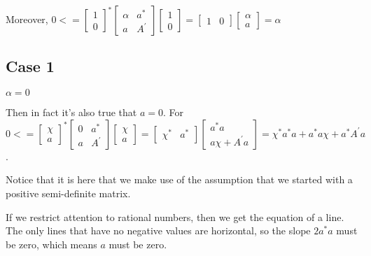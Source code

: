 \documentclass{article}
\begin{document}
Moreover, 
\begin{math}{}
0 <= \begin{bmatrix}1\\0\end{bmatrix}^*\begin{bmatrix}\alpha & a^* \\ a & A^{'}\end{bmatrix}\begin{bmatrix}1\\0\end{bmatrix}
= \begin{bmatrix}1&0\end{bmatrix}\begin{bmatrix}\alpha \\ a\end{bmatrix}
= \alpha
\end{math}

\subsection{Case 1}
\begin{math}{}\alpha=0\end{math}

Then in fact it's also true that \begin{math}{}a=0\end{math}. For 
\begin{math}0 <= \begin{bmatrix}\chi\\a\end{bmatrix}^*\begin{bmatrix}0 & a^* \\ a & A^{'}\end{bmatrix}\begin{bmatrix}\chi\\a\end{bmatrix} = \begin{bmatrix}\chi^* & a^*\end{bmatrix} \begin{bmatrix}a^*a\\a\chi+A^{'}a\end{bmatrix}
= \chi^*a^*a + a^*a\chi + a^*A^{'}a
\end{math}.

Notice that it is here that we make use of the assumption that we started with
a positive semi-definite matrix.

If we restrict attention to rational numbers, then we get the equation of a line. The only lines that have no negative values are horizontal, so the slope \begin{math}{}2a^*a\end{math} must be zero, which means \begin{math}{}a\end{math} must be zero.
\end{document}
